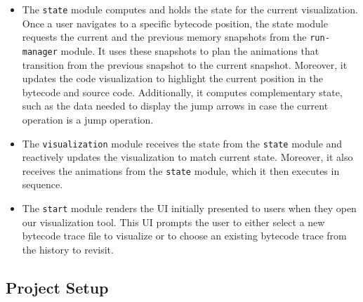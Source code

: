 \documentclass[conference]{IEEEtran}
\begin{document}
\begin{itemize}
    \item The \texttt{state} module computes and holds the state for the current visualization. Once a user navigates to a specific bytecode position, the state module requests the current and the previous memory snapshots from the \texttt{run-manager} module. It uses these snapshots to plan the animations that transition from the previous snapshot to the current snapshot. Moreover, it updates the code visualization to highlight the current position in the bytecode and source code. Additionally, it computes complementary state, such as the data needed to display the jump arrows in case the current operation is a jump operation.
    
    \item The \texttt{visualization} module receives the state from the \texttt{state} module and reactively updates the visualization to match current state. Moreover, it also receives the animations from the \texttt{state} module, which it then executes in sequence.

    \item The \texttt{start} module renders the UI initially presented to users when they open our visualization tool. This UI prompts the user to either select a new bytecode trace file to visualize or to choose an existing bytecode trace from the history to revisit.
    
\end{itemize}







\subsection{Project Setup}
\end{document}
